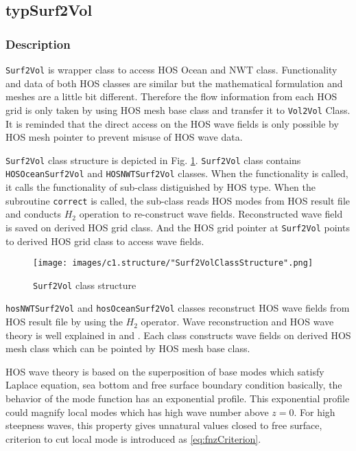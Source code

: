 \pagebreak	
\subsection{typSurf2Vol}

\subsubsection{Description}

\texttt{Surf2Vol} is wrapper class to access HOS Ocean and NWT class. Functionality and data of both HOS classes are similar but the mathematical formulation and meshes are a little bit different. Therefore the flow information from each HOS grid is only taken by using HOS mesh base class and transfer it to \texttt{Vol2Vol} Class. It is reminded that the direct access on the HOS wave fields is only possible by HOS mesh pointer to prevent misuse of HOS wave data. 

\texttt{Surf2Vol} class structure is depicted in Fig. \ref{fig:surf2VolStructure}. \texttt{Surf2Vol} class contains \texttt{HOSOceanSurf2Vol} and \texttt{HOSNWTSurf2Vol} classes. When the functionality is called, it calls the functionality of sub-class distiguished by HOS type. When the subroutine \texttt{correct} is called, the sub-class reads HOS modes from HOS result file and conducts $H_2$ operation to re-construct wave fields. Reconstructed wave field is saved on derived HOS grid class. And the HOS grid pointer at \texttt{Surf2Vol} points to derived HOS grid class to access wave fields. 

\vspace{0.5cm}
{
	\begin{figure} [H]
		\centering
		\texttt{[image: images/c1.structure/"Surf2VolClassStructure".png]}
		\vspace{0.5cm}
		\caption{\texttt{Surf2Vol} class structure}
		\label{fig:surf2VolStructure}
	\end{figure}
}

\pagebreak

\texttt{hosNWTSurf2Vol} and \texttt{hosOceanSurf2Vol} classes reconstruct HOS wave fields from HOS result file by using the $H_2$ operator. Wave reconstruction and HOS wave theory is well explained in \cite{ducrozet2007} and \cite{ducrozet2012}. Each class constructs wave fields on derived HOS mesh class which can be pointed by HOS mesh base class. 

HOS wave theory is based on the superposition of base modes which satisfy Laplace equation, sea bottom and free surface boundary condition basically, the behavior of the mode function has an exponential profile. This exponential profile could magnify local modes which has high wave number above $z=0$. For high steepness waves, this property gives unnatural values closed to free surface, criterion to cut local mode is introduced as \eqref{eq:fnzCriterion}. 

